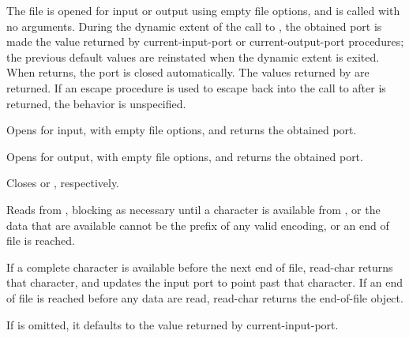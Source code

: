 \begin{entry}{%
}

  The
file is opened for input or output using empty file options, and
 is called with no arguments.  During the dynamic extent of
the call to , the obtained port is made the value returned
by {\cf current-input-port} or {\cf current-output-port} procedures;
the previous default values are reinstated when the dynamic extent is
exited.  When  returns, the port is closed automatically.
The values
returned by  are returned.  If an escape procedure is used
to escape back into the call to  after  is
returned, the behavior is unspecified.
\end{entry}

\begin{entry}{%
}

Opens  for input, with empty file options, and returns
the obtained port.
\end{entry}

\begin{entry}{%
}

Opens  for output, with empty file options, and
returns the obtained port.
\end{entry}

\begin{entry}{%
}

Closes  or , respectively.
\end{entry}

\begin{entry}{%
}

Reads from ,
blocking as necessary until a character
is available from ,
or the data that are available cannot
be the prefix of any valid encoding, or an end of file is reached.

If a complete character is available before the next end of file, {\cf
  read-char} returns that character, and updates the input port to
point past that character. If an end of file is
reached before any data are read, {\cf read-char} returns the
end-of-file object.

If  is omitted, it defaults to the value returned by
{\cf current-input-port}.
\end{entry}

